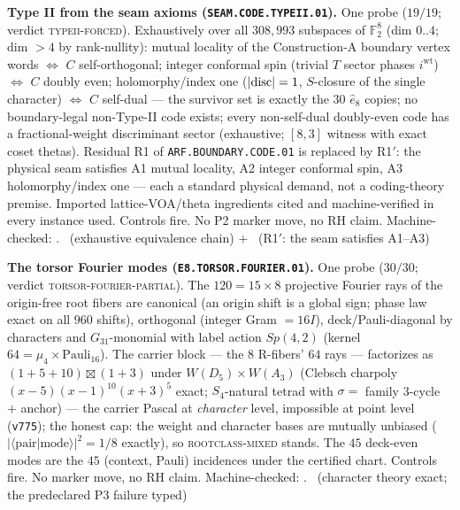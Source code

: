 \documentclass[11pt,a4paper]{article}
\theoremstyle{definition}
\begin{document}
\par\smallskip\noindent\textbf{Type II from the seam axioms
(\texttt{SEAM.CODE.TYPEII.01}).}
One probe ($19/19$; verdict \textsc{typeii-forced}).  Exhaustively
over all $308{,}993$ subspaces of $\mathbb F_2^8$ (dim $0..4$;
dim $>4$ by rank-nullity): mutual locality of the Construction-A
boundary vertex words $\iff$ $C$ self-orthogonal; integer conformal
spin (trivial $T$ sector phases $i^{\mathrm{wt}}$) $\iff$ $C$ doubly
even; holomorphy/index one ($|{\rm disc}|=1$, $S$-closure of the
single character) $\iff$ $C$ self-dual --- the survivor set is
exactly the $30$ $\hat e_8$ copies; no boundary-legal non-Type-II
code exists; every non-self-dual doubly-even code has a
fractional-weight discriminant sector (exhaustive; $[8,3]$ witness
with exact coset thetas).  Residual R1 of
\texttt{ARF.BOUNDARY.CODE.01} is replaced by R1$'$: the physical
seam satisfies A1 mutual locality, A2 integer conformal spin, A3
holomorphy/index one --- each a standard physical demand, not a
coding-theory premise.  Imported lattice-VOA/theta ingredients
cited and machine-verified in every instance used.  Controls fire.
No P2 marker move, no RH claim.
Machine-checked: .
\mE\ (exhaustive equivalence chain) $+$ \mC\ (R1$'$: the seam
satisfies A1--A3)
\par\smallskip

\par\smallskip\noindent\textbf{The torsor Fourier modes
(\texttt{E8.TORSOR.FOURIER.01}).}
One probe ($30/30$; verdict \textsc{torsor-fourier-partial}).  The
$120=15\times8$ projective Fourier rays of the origin-free root
fibers are canonical (an origin shift is a global sign; phase law
exact on all $960$ shifts), orthogonal (integer Gram $=16I$),
deck/Pauli-diagonal by characters and $G_{31}$-monomial with label
action $Sp(4,2)$ (kernel $64=\mu_4\times\mathrm{Pauli}_{16}$).  The
carrier block --- the $8$ R-fibers' $64$ rays --- factorizes as
$(1{+}5{+}10)\boxtimes(1{+}3)$ under $W(D_5)\times W(A_3)$ (Clebsch
charpoly $(x{-}5)(x{-}1)^{10}(x{+}3)^5$ exact; $S_4$-natural tetrad
with $\sigma=$ family 3-cycle $+$ anchor) --- the carrier Pascal at
\emph{character} level, impossible at point level
(\texttt{v775}); the honest cap: the weight and character bases are
mutually unbiased ($|\langle\text{pair}|\text{mode}\rangle|^2=1/8$
exactly), so \textsc{rootclass-mixed} stands.  The $45$ deck-even
modes are the $45$ (context, Pauli) incidences under the certified
chart.  Controls fire.  No marker move, no RH claim.
Machine-checked: .
\mE\ (character theory exact; the predeclared P3 failure typed)
\par\smallskip
\end{document}
